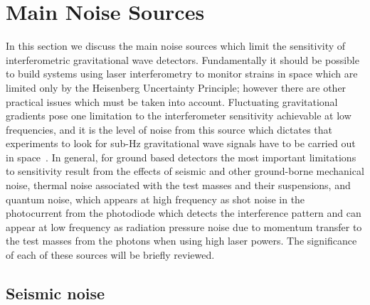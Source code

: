 \documentclass{article}
\begin{document}

\newpage

\section{Main Noise Sources}
\label{section:noise}

In this section we discuss the main noise sources which limit the sensitivity of
interferometric gravitational wave detectors. Fundamentally it should be
possible to build systems using laser interferometry to monitor strains in space
which are limited only by the Heisenberg Uncertainty Principle; however there
are other practical issues which must be taken into account. Fluctuating
gravitational gradients pose one limitation to the interferometer sensitivity
achievable at low frequencies, and it is the level of noise from this source
which dictates that experiments to look for sub-Hz gravitational wave signals
have to be carried out in space~\cite{Spero, Saulson1, Beccaria, Hughes}. In
general, for ground based detectors the most important limitations to
sensitivity result from the effects of seismic and other ground-borne mechanical
noise, thermal noise associated with the test masses and their suspensions, and
quantum noise, which appears at high frequency as shot noise in the photocurrent
from the photodiode which detects the interference pattern and can appear at low
frequency as radiation pressure noise due to momentum transfer to the test
masses from the photons when using high laser powers. The significance of each
of these sources will be briefly reviewed.


\subsection{Seismic noise}
\label{subsection:seismic}
\end{document}
